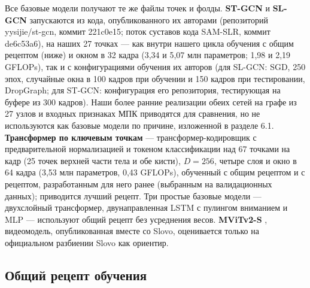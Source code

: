 \documentclass[a4paper,fleqn]{cas-dc}
\begin{document}
Все базовые модели получают те же файлы точек и фолды. \textbf{ST-GCN} \cite{2018_yan_stgcn} и \textbf{SL-GCN} \cite{2021_jiang_sam_slr} запускаются из кода, опубликованного их авторами (репозиторий yysijie/st-gcn, коммит 221c0e15; поток суставов кода SAM-SLR, коммит de6c53a6), на наших 27 точках --- как внутри нашего цикла обучения с общим рецептом (ниже) и окном в 32 кадра (3,34 и 5,07 млн параметров; 1,98 и 2,19 GFLOPs), так и с конфигурациями обучения их авторов (для SL-GCN: SGD, 250 эпох, случайные окна в 100 кадров при обучении и 150 кадров при тестировании, DropGraph; для ST-GCN: конфигурация его репозитория, тестирующая на буфере из 300 кадров). Наши более ранние реализации обеих сетей на графе из 27 узлов и входных признаках МПК приводятся для сравнения, но не используются как базовые модели по причине, изложенной в разделе 6.1. \textbf{Трансформер по ключевым точкам} --- трансформер-кодировщик с предварительной нормализацией \cite{2017_vaswani_attention} и токеном классификации над 67 точками на кадр (25 точек верхней части тела и обе кисти), \(D = 256\), четыре слоя и окно в 64 кадра (3,53 млн параметров, 0,43 GFLOPs), обученный с общим рецептом и с рецептом, разработанным для него ранее (выбранным на валидационных данных); приводится лучший рецепт. Три простые базовые модели --- двухслойный трансформер, двунаправленная LSTM с пулингом вниманием и MLP --- используют общий рецепт без усреднения весов. \textbf{MViTv2-S} \cite{2022_li_mvitv2}, видеомодель, опубликованная вместе со Slovo, оценивается только на официальном разбиении Slovo как ориентир.

\hypertarget{ux43eux431ux449ux438ux439-ux440ux435ux446ux435ux43fux442-ux43eux431ux443ux447ux435ux43dux438ux44f}{%
\subsection{Общий рецепт обучения}\label{ux43eux431ux449ux438ux439-ux440ux435ux446ux435ux43fux442-ux43eux431ux443ux447ux435ux43dux438ux44f}}
\end{document}
